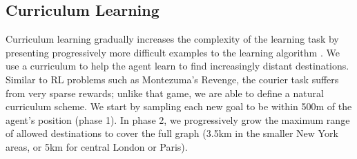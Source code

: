 \subsection{Curriculum Learning}
\label{sec:curriculum}

Curriculum learning gradually increases the complexity of the learning task by presenting progressively more difficult examples to the learning algorithm \cite{bengio2009curriculum, graves2017automated,zaremba2014learning}. We use a curriculum to help the agent learn to find increasingly distant destinations. Similar to RL problems such as Montezuma's Revenge, the courier task suffers from very sparse rewards; unlike that game, we are able to define a natural curriculum scheme. We start by sampling each new goal to be within 500m of the agent's position (phase 1).
In phase 2, we progressively grow the maximum range of allowed destinations to cover the full graph (3.5km in the smaller New York areas, or 5km for central London or Paris).
